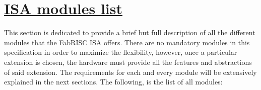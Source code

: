 \section[ISA modules list]{\LARGE\underline{ISA modules list}}

    \vspace{10pt}

    This section is dedicated to provide a brief but full description of all the different modules that the FabRISC ISA offers. There are no mandatory modules in this specification in order to maximize the flexibility, however, once a particular extension is chosen, the hardware must provide all the features and abstractions of said extension. The requirements for each and every module will be extensively explained in the next sections. The following, is the list of all modules:


